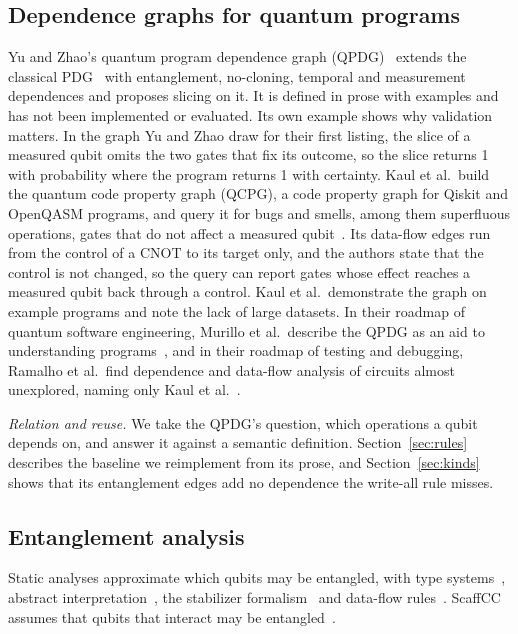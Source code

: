 \subsection{Dependence graphs for quantum programs}
Yu and Zhao's quantum program dependence graph (QPDG)~\cite{yu2025qpdg} extends the classical
PDG~\cite{ferrante1987pdg} with entanglement, no-cloning, temporal and measurement dependences and proposes
slicing on it. It is defined in prose with examples and has not been implemented or evaluated. Its own example
shows why validation matters. In the graph Yu and Zhao draw for their first listing, the slice of a measured
qubit omits the two gates that fix its outcome, so the slice returns 1 with probability
\numYzFigSliceProb{} where the program returns 1 with certainty. Kaul et al.\ build the quantum code property graph
(QCPG), a code property graph for Qiskit and OpenQASM programs, and query it for bugs and smells, among them superfluous operations, gates that
do not affect a measured qubit~\cite{kaul2023uniform}. Its data-flow edges run from the control of a CNOT to its target only, and the
authors state that the control is not changed, so the query can report gates whose effect reaches a measured
qubit back through a control. Kaul et al.\
demonstrate the graph on example programs and note the lack of large datasets.
In their roadmap of quantum software engineering, Murillo et al.\ describe the QPDG as an aid to
understanding programs~\cite{murillo2025roadmap}, and in their roadmap of testing and debugging, Ramalho et al.\
find dependence and data-flow analysis of circuits almost unexplored, naming only Kaul et al.~\cite{ramalho2025road}.

\emph{Relation and reuse.} We take the QPDG's question, which operations a qubit depends on, and answer it
against a semantic definition. Section~\ref{sec:rules} describes the baseline we reimplement from its prose, and
Section~\ref{sec:kinds} shows that its entanglement edges add no dependence the write-all rule misses.

\subsection{Entanglement analysis}
Static analyses approximate which qubits may be entangled, with type systems~\cite{perdrix2007types,
prost2009reasoning, yuan2022twist}, abstract interpretation~\cite{perdrix2008entanglement, yu2021abstract}, the
stabilizer formalism~\cite{honda2015stabilizer} and data-flow rules~\cite{xia2025entanglement}. ScaffCC assumes
that qubits that interact may be entangled~\cite{javadiabhari2015scaffcc}.

